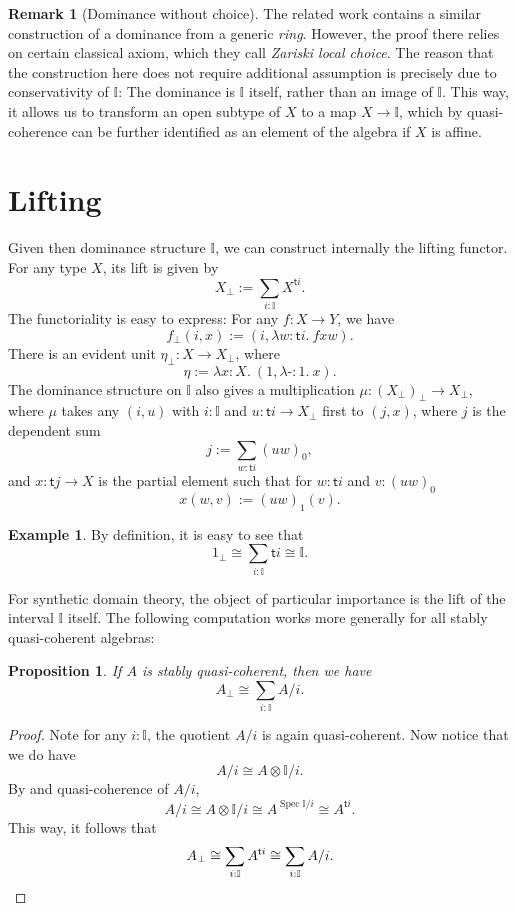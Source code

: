 \documentclass[12pt]{amsart}
\newtheorem{proposition}[theorem]{Proposition}
\theoremstyle{definition}
\newtheorem{example}[theorem]{Example}
\newtheorem{remark}[theorem]{Remark}
\newcommand{\mbb}[1]{\mathbb{#1}}
\newcommand{\I}{\mbb I}
\newcommand{\ms}[1]{\mathsf{#1}}
\newcommand{\prt}{_{\bot}}
\newcommand{\ld}[2]{\lambda #1\!\colon\!\!#2.\ }
\newcommand{\hp}{\text{-}}
\newcommand{\spec}{\operatorname{Spec}}
\begin{document}
\begin{remark}[Dominance without choice]\label{rem:dominancewithoutchoice}
  The related work \cite{Cherubini_Coquand_Hutzler_2024} contains a similar construction of a dominance from a generic \emph{ring}. However, the proof there relies on certain classical axiom, which they call \emph{Zariski local choice}. The reason that the construction here does not require additional assumption is precisely due to conservativity of $\I$: The dominance is $\I$ itself, rather than an image of $\I$. This way, it allows us to transform an open subtype of $X$ to a map $X \to \I$, which by quasi-coherence can be further identified as an element of the algebra if $X$ is affine. 
\end{remark}


\section{Lifting}\label{sec:lifting}

Given then dominance structure $\I$, we can construct internally the lifting functor. For any type $X$, its lift is given by
\[ X\prt := \sum_{i:\I}X^{\ms ti}. \]
The functoriality is easy to express: For any $f : X \to Y$, we have
\[ f\prt(i,x) := (i,\ld{w}{\ms ti}fxw). \]
There is an evident unit $\eta\prt : X \to X\prt$, where
\[ \eta := \ld x X(1,\ld\hp 1 x). \]
The dominance structure on $\I$ also gives a multiplication $\mu : (X\prt)\prt \to X\prt$, where $\mu$ takes any $(i,u)$ with $i : \I$ and $u : \ms ti \to X\prt$ first to $(j,x)$, where $j$ is the dependent sum
\[ j := \sum_{w:\ms ti} (uw)_0, \]
and $x : \ms tj \to X$ is the partial element such that for $w : \ms ti$ and $v : (uw)_0$
\[ x(w,v) := (uw)_1(v). \]

\begin{example}
  By definition, it is easy to see that
  \[ 1\prt \cong \sum_{i:\I}\ms ti \cong \I. \]
\end{example}

For synthetic domain theory, the object of particular importance is the lift of the interval $\I$ itself. The following computation works more generally for all stably quasi-coherent algebras:

\begin{proposition}\label{prop:liftingofalgebra}
  If $A$ is stably quasi-coherent, then we have
  \[ A\prt \cong \sum_{i:\I}A/i. \]
\end{proposition}
\begin{proof}
  Note for any $i : \I$, the quotient $A/i$ is again quasi-coherent. Now notice that we do have
  \[ A/i \cong A \otimes \I/i. \]
  By  and quasi-coherence of $A/i$, 
  \[ A/i \cong A \otimes \I/i \cong A^{\spec \I/i} \cong A^{\ms ti}. \]
  This way, it follows that 
  \[ A\prt \cong \sum_{i:\I}A^{\ms ti} \cong \sum_{i:\I}A/i. \qedhere \]
\end{proof}
\end{document}
